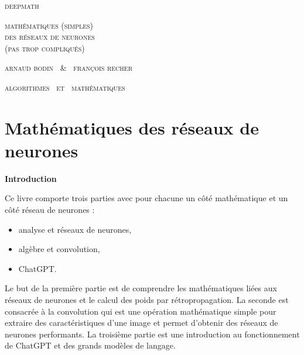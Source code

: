 
\pagestyle{empty}\thispagestyle{empty}
\vspace*{\fill}
\vspace*{5ex}
\begin{center}
	\fontsize{40}{40}\selectfont
	\textsc{deepmath}
	
	\vspace*{1ex}
	\textsc{\fontsize{24}{24}\selectfont 
	mathématiques (simples) \\
	des réseaux de neurones \\[-18pt]
	(pas trop compliqués)
	}
	
	\vspace*{2ex}
	
	\Large
	\textsc{arnaud bodin \ \& \ françois recher}

\end{center}
\vfill
\begin{center}
	\Large
	\textsc{algorithmes \  et \  mathématiques}
\end{center}
\begin{center}
\end{center}

\clearemptydoublepage

\thispagestyle{empty}

\vspace*{\fill}
\section*{Mathématiques des réseaux de neurones}

{\large\textbf{Introduction}}

Ce livre comporte trois parties avec pour chacune un côté \og{}mathématique\fg{} et un côté \og{}réseau de neurones\fg{} :
\begin{itemize}
  \item analyse et réseaux de neurones,
  \item algèbre et convolution,
  \item ChatGPT.
\end{itemize}

Le but de la première partie est de comprendre les mathématiques liées aux réseaux de neurones et le calcul des poids par rétropropagation. La seconde est consacrée à la convolution qui est une opération mathématique simple pour extraire des caractéristiques d'une image et permet d'obtenir des réseaux de neurones performants. La troisième partie est une introduction au fonctionnement de ChatGPT et des grands modèles de langage.

